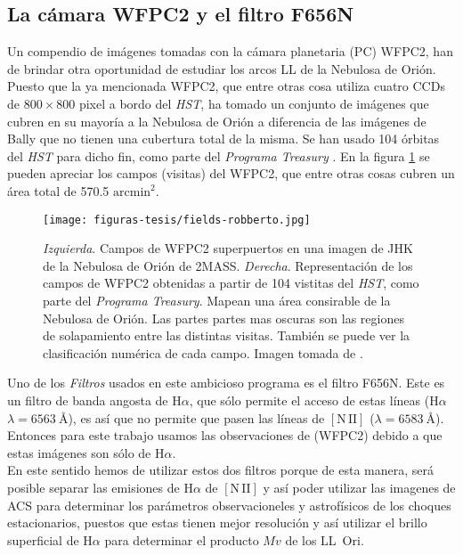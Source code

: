 \documentclass{article}
\newcommand\ha{\ensuremath{\mathrm{H}\alpha}}
\newcommand\nii{\ensuremath{\mathrm{[N\,II]}}}
\begin{document}
\subsection{La cámara WFPC2 y el filtro F656N}
\label{sec:wfpc2}

Un compendio de imágenes tomadas con la cámara planetaria (PC) WFPC2, han de brindar otra oportunidad de estudiar los arcos LL de la Nebulosa de Orión. Puesto que la ya mencionada WFPC2, que entre otras cosa utiliza cuatro CCDs de $800\times800$ pixel a bordo del \textit{HST}, ha tomado un conjunto de imágenes que cubren en su mayoría a la Nebulosa de Orión a diferencia de las imágenes de Bally que no tienen una cubertura total de la misma. Se han usado 104 órbitas del \textit{HST} para dicho fin, como parte del \textit{Programa Treasury} \citep{Robberto:2013a}. En la figura \ref{fig:fields-robberto} se pueden apreciar los campos (visitas) del WFPC2, que entre otras cosas cubren un área total de 570.5 \(\text{arcmin}^{2}\).\\

\begin{figure}
  \centering
  \texttt{[image: figuras-tesis/fields-robberto.jpg]}
  \caption{\textit{Izquierda}. Campos de WFPC2 superpuertos en una imagen de JHK de la Nebulosa de Orión de 2MASS. \textit{Derecha}. Representación de los campos de WFPC2 obtenidas a partir de 104 vistitas del \textit{HST}, como parte del \textit{Programa Treasury}. Mapean una área consirable de la Nebulosa de Orión. Las partes partes mas oscuras son las regiones de solapamiento entre las distintas visitas. También se puede ver la clasificación numérica de cada campo. Imagen tomada de \citet{Robberto:2013a}.}
  \label{fig:fields-robberto}
\end{figure}

Uno de los \textit{Filtros} usados en este ambicioso programa es el filtro F656N. Este es un filtro de banda angosta de \ha{}, que sólo permite el acceso de estas líneas (\ha{}~\(\lambda = 6563~\text{\AA{}}\)), es así que no permite que pasen las líneas de \nii{} (\(\lambda = 6583~\text{\AA{}}\)). Entonces para este trabajo usamos las observaciones de \citet{Robberto:2013a} (WFPC2) debido a que estas imágenes son sólo de \ha{}.\\

 En este sentido hemos de utilizar estos dos filtros porque de esta manera, será posible separar las emisiones de \ha{} de \nii{} y así poder utilizar las imagenes de ACS para determinar los parámetros observacioneles y astrofísicos de los choques estacionarios, puestos que estas tienen mejor resolución y así utilizar el brillo superficial de \ha{} para determinar el producto \(Mv\) de los LL~Ori.
\end{document}

